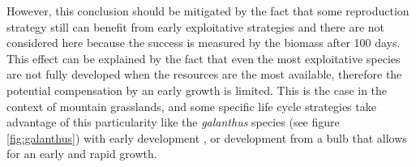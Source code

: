 However, this conclusion should be mitigated by the fact that some reproduction strategy still can benefit from early exploitative strategies and there are not considered here because the success is measured by the biomass after 100 days. This effect can be explained by the fact that even the most exploitative species are not fully developed when the resources are the most available, therefore the potential compensation by an early growth is limited. This is the case in the context of mountain grasslands, and some specific life cycle strategies take advantage of this particularity like the \textit{galanthus} species (see figure \ref{fig:galanthus}) with early development \parencite{schroder_modelling_2014}, or development from a bulb that allows for an early and rapid growth.


